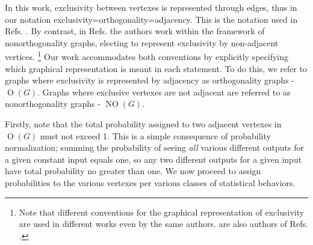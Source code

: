 \documentclass[
  12pt          %
  ,letterpaper  %
  ,center       %
  ,noupper      %
  ,english,fleqn]{uconnthesis}
\begin{document}
In this work, exclusivity between vertexes is represented through edges, thus in our notation exclusivity=orthogonality=adjacency. This is the notation used in Refs. \cite{CSWOld,EPOriginal,VariousCHSHBellInequalities,LONatureComm,CSWNew,LOExploring,CabelloMultigraph}. By contrast, in Refs. \cite{FritzCombinatorialLong,LONewShort} the authors work within the framework of nonorthogonality graphs, electing to represent exclusivity by non-adjacent vertices. \footnote{Note that different conventions for the graphical representation of exclusivity are used in different works even by the same authors. \citet{FritzCombinatorialLong} are also authors of Refs. \cite{LONatureComm,LOExploring}.} Our work accommodates both conventions by explicitly specifying which graphical representation is meant in each statement. 
To do this, we refer to graphs where exclusivity is represented by adjacency as orthogonality graphs - $\operatorname{O}{\left(G\right)}$. Graphs where exclusive vertexes are not adjacent are referred to as nonorthogonality graphs - $\operatorname{NO}{\left(G\right)}$.

Firstly, note that the total probability assigned to two adjacent vertexes in $\operatorname{O}{\left(G\right)}$ must not exceed 1. This is a simple consequence of probability normalization; summing the probability of seeing {\em all} various different outputs for a given constant input equals one, so any two different outputs for a given input have total probability no greater than one. We now proceed to assign probabilities to the various vertexes per various classes of statistical behaviors.
\end{document}
